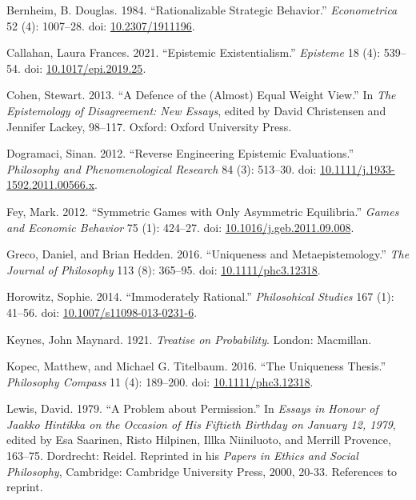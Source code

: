 \documentclass[
  10pt,
  letterpaper,
  DIV=11,
  numbers=noendperiod,
  twoside]{scrartcl}
\newlength{\cslhangindent}
\newenvironment{CSLReferences}[2] %
 {\begin{list}{}{%
  \setlength{\itemindent}{0pt}
  \setlength{\leftmargin}{0pt}
  \setlength{\parsep}{0pt}
  \ifodd #1
   \setlength{\leftmargin}{\cslhangindent}
   \setlength{\itemindent}{-1\cslhangindent}
  \fi
  \setlength{\itemsep}{#2\baselineskip}}}
 {\end{list}}
\begin{document}
\label{refs}
\begin{CSLReferences}{1}{0}
Bernheim, B. Douglas. 1984. {``Rationalizable Strategic Behavior.''}
\emph{Econometrica} 52 (4): 1007--28. doi:
\href{https://doi.org/10.2307/1911196}{10.2307/1911196}.

Callahan, Laura Frances. 2021. {``Epistemic Existentialism.''}
\emph{Episteme} 18 (4): 539--54. doi:
\href{https://doi.org/10.1017/epi.2019.25}{10.1017/epi.2019.25}.

Cohen, Stewart. 2013. {``A Defence of the (Almost) Equal Weight View.''}
In \emph{The Epistemology of Disagreement: New Essays}, edited by David
Christensen and Jennifer Lackey, 98--117. Oxford: Oxford University
Press.

Dogramaci, Sinan. 2012. {``Reverse Engineering Epistemic Evaluations.''}
\emph{Philosophy and Phenomenological Research} 84 (3): 513--30. doi:
\href{https://doi.org/10.1111/j.1933-1592.2011.00566.x}{10.1111/j.1933-1592.2011.00566.x}.

Fey, Mark. 2012. {``Symmetric Games with Only Asymmetric Equilibria.''}
\emph{Games and Economic Behavior} 75 (1): 424--27. doi:
\href{https://doi.org/10.1016/j.geb.2011.09.008}{10.1016/j.geb.2011.09.008}.

Greco, Daniel, and Brian Hedden. 2016. {``Uniqueness and
Metaepistemology.''} \emph{The Journal of Philosophy} 113 (8): 365--95.
doi: \href{https://doi.org/10.1111/phc3.12318}{10.1111/phc3.12318}.

Horowitz, Sophie. 2014. {``Immoderately Rational.''} \emph{Philosohical
Studies} 167 (1): 41--56. doi:
\href{https://doi.org/10.1007/s11098-013-0231-6}{10.1007/s11098-013-0231-6}.

Keynes, John Maynard. 1921. \emph{Treatise on Probability}. London:
Macmillan.

Kopec, Matthew, and Michael G. Titelbaum. 2016. {``The Uniqueness
Thesis.''} \emph{Philosophy Compass} 11 (4): 189--200. doi:
\href{https://doi.org/10.1111/phc3.12318}{10.1111/phc3.12318}.

Lewis, David. 1979. {``A Problem about Permission.''} In \emph{Essays in
Honour of {J}aakko Hintikka on the Occasion of His Fiftieth Birthday on
{J}anuary 12, 1979}, edited by Esa Saarinen, Risto Hilpinen, Illka
Niiniluoto, and Merrill Provence, 163--75. Dordrecht: Reidel. Reprinted
in his \emph{Papers in Ethics and Social Philosophy}, Cambridge:
Cambridge University Press, 2000, 20-33. References to reprint.


\end{CSLReferences}
\end{document}

